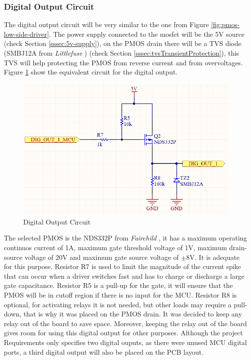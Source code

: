 		\subsubsection{Digital Output Circuit}\label{sssec:digital-output-circuit}

			The digital output circuit will be very similar to the one from Figure \ref{fig:pmos-low-side-driver}. The power supply connected to the mosfet will be the 5V source (check Section \ref{sssec:5v-supply}), on the PMOS drain there will be a TVS diode (SMBJ12A from \textit{Littlefuse} \cite{smbj12a-datasheet}) (check Section \ref{sssec:tvsTransientProtection}), this TVS will help protecting the PMOS from reverse current and from overvoltages. Figure \ref{fig:digital-output-circuit} show the equivalent circuit for the digital output.

			\begin{figure}[htbp]
				\centering
				\includegraphics[width=.7\textwidth]{figuras/fig-digital-output-circuit.png}
				\caption{Digital Output Circuit}
				\label{fig:digital-output-circuit}
			\end{figure}

			The selected PMOS is the NDS332P from \textit{Fairchild} \cite{nds332p-datasheet}, it has a maximum operating continuos current of 1A, maximum gate threshold voltage of 1V, maximum drain-source voltage of 20V and maximum gate source voltage of $\pm$8V. It is adequate for this purpose. Resistor R7 is used to limit the magnitude of the current spike that can occur when a driver switches fast and has to charge or discharge a large gate capacitance. Resistor R5 is a pull-up for the gate, it will ensure that the PMOS will be in cutoff region if there is no input for the MCU. Resistor R8 is optional, for activating relays it is not needed, but other loads may require a pull-down, that is why it was placed on the PMOS drain. It was decided to keep any relay out of the board to save space. Moreover, keeping the relay out of the board gives room for using this digital output for other purposes. Although the project Requirements only specifies two digital ouputs, as there were unused MCU digital ports, a third digital output will also be placed on the PCB layout. 

